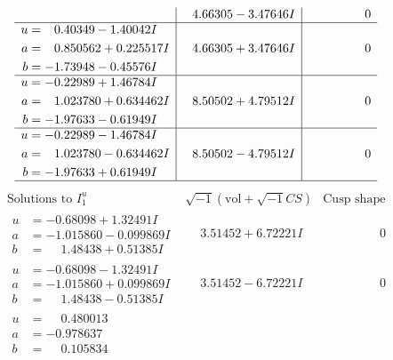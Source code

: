 \documentclass[1p]{elsarticle_modified}
\theoremstyle{definition}
\newcommand{\I}{\sqrt{-1}}
\begin{document}
$$\begin{array}{c|c|c}
 & \phantom{-}4.66305 - 3.47646 I & \phantom{-0.000000 } 0 \\ \hline\begin{aligned}
u &= \phantom{-}0.40349 - 1.40042 I \\
a &= \phantom{-}0.850562 + 0.225517 I \\
b &= -1.73948 - 0.45576 I\end{aligned}
 & \phantom{-}4.66305 + 3.47646 I & \phantom{-0.000000 } 0 \\ \hline\begin{aligned}
u &= -0.22989 + 1.46784 I \\
a &= \phantom{-}1.023780 + 0.634462 I \\
b &= -1.97633 - 0.61949 I\end{aligned}
 & \phantom{-}8.50502 + 4.79512 I & \phantom{-0.000000 } 0 \\ \hline\begin{aligned}
u &= -0.22989 - 1.46784 I \\
a &= \phantom{-}1.023780 - 0.634462 I \\
b &= -1.97633 + 0.61949 I\end{aligned}
 & \phantom{-}8.50502 - 4.79512 I & \phantom{-0.000000 } 0\\
 \hline 
 \end{array}$$\newpage$$\begin{array}{c|c|c}  
\text{Solutions to }I^u_{1}& \I (\text{vol} + \sqrt{-1}CS) & \text{Cusp shape}\\
 \hline 
\begin{aligned}
u &= -0.68098 + 1.32491 I \\
a &= -1.015860 - 0.099869 I \\
b &= \phantom{-}1.48438 + 0.51385 I\end{aligned}
 & \phantom{-}3.51452 + 6.72221 I & \phantom{-0.000000 } 0 \\ \hline\begin{aligned}
u &= -0.68098 - 1.32491 I \\
a &= -1.015860 + 0.099869 I \\
b &= \phantom{-}1.48438 - 0.51385 I\end{aligned}
 & \phantom{-}3.51452 - 6.72221 I & \phantom{-0.000000 } 0 \\ \hline\begin{aligned}
u &= \phantom{-}0.480013\phantom{ +0.000000I} \\
a &= -0.978637\phantom{ +0.000000I} \\
b &= \phantom{-}0.105834\phantom{ +0.000000I}\end{aligned}

\end{array}$$
\end{document}
